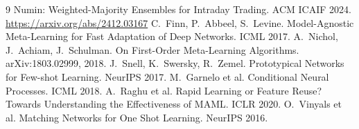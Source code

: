 \documentclass[11pt,a4paper]{article}
\begin{document}
\begin{thebibliography}{9}
 Numin: Weighted-Majority Ensembles for Intraday Trading. ACM ICAIF 2024. \url{https://arxiv.org/abs/2412.03167}
 C.~Finn, P.~Abbeel, S.~Levine. Model-Agnostic Meta-Learning for Fast Adaptation of Deep Networks. ICML 2017.
 A.~Nichol, J.~Achiam, J.~Schulman. On First-Order Meta-Learning Algorithms. arXiv:1803.02999, 2018.
 J.~Snell, K.~Swersky, R.~Zemel. Prototypical Networks for Few-shot Learning. NeurIPS 2017.
 M.~Garnelo et al. Conditional Neural Processes. ICML 2018.
 A.~Raghu et al. Rapid Learning or Feature Reuse? Towards Understanding the Effectiveness of MAML. ICLR 2020.
 O.~Vinyals et al. Matching Networks for One Shot Learning. NeurIPS 2016.
\end{thebibliography}
\end{document}

